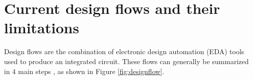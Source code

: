 %
%
%

\section{Current design flows and their limitations}
\label{sec:currentflows}

Design flows are the combination of electronic design automation (EDA) tools used to produce an integrated circuit. These flows can generally be summarized in 4 main steps \cite{coursefred}, as shown in Figure \ref{fig:designflow}.

